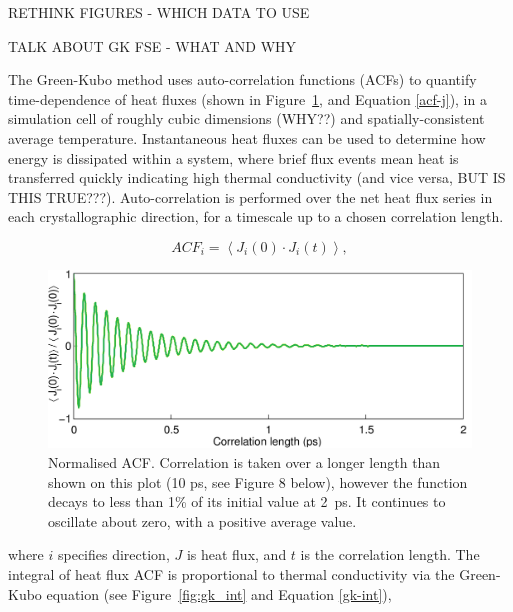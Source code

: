 \documentclass[%
preprint,                                  %
nofootinbib,
 amsmath,amssymb,
 aps,
]{revtex4-1}
\begin{document}
RETHINK FIGURES - WHICH DATA TO USE

TALK ABOUT GK FSE - WHAT AND WHY

The Green-Kubo method uses auto-correlation functions (ACFs) to quantify time-dependence of heat fluxes (shown in Figure~\ref{fig:gk_acf}, and Equation \ref{acf-j}), in a simulation cell of roughly cubic dimensions (WHY??) and spatially-consistent average temperature. Instantaneous heat fluxes can be used to determine how energy is dissipated within a system, where brief flux events mean heat is transferred quickly indicating high thermal conductivity (and vice versa, BUT IS THIS TRUE???). Auto-correlation is performed over the net heat flux series in each crystallographic direction, for a timescale up to a chosen correlation length.

\begin{equation}
ACF_i = \left \langle J_i(0) \cdot  J_i(t) \right \rangle,
\label{acf-j}
\end{equation}
\begin{figure}[h]
  \includegraphics[width=\linewidth]{images/gk_acf.png}
  \caption{Normalised ACF. Correlation is taken over a longer length than shown on this plot (10 ps, see Figure 8 below), however the function decays to less than 1\% of its initial value at 2~ps. It continues to oscillate about zero, with a positive average value.}
  \label{fig:gk_acf}
\end{figure}
where $i$ specifies direction, $J$ is heat flux, and $t$ is the correlation length. The integral of heat flux ACF is proportional to thermal conductivity via the Green-Kubo equation (see Figure~\ref{fig:gk_int} and Equation \ref{gk-int}), 
\end{document}
